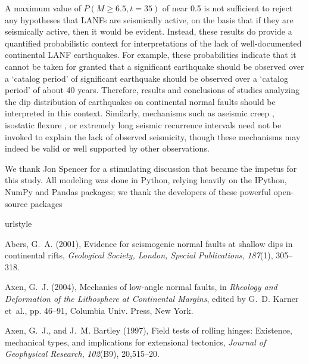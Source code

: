 \documentclass[draft,grl]{AGUTeX}
\begin{document}
\begin{article}
A maximum value of $P(M\ge6.5,t=35)$ of near 0.5 is not sufficient to
reject any hypotheses that LANFs are seismically active, on the basis that
if they are seismically active, then it would be evident.  Instead, these
results do provide a quantified probabilistic context for interpretations
of the lack of well-documented continental LANF earthquakes.  For example,
these probabilities indicate that it cannot be taken for granted that a
significant earthquake should be observed over a `catalog period' of
significant earthquake should be observed over a `catalog period' of
about 40 years. Therefore, results and conclusions of studies
analyzing the dip distribution of earthquakes on continental normal
faults \citep{jackson1987, collettinisibson2001} should be interpreted
in this context.  Similarly, mechanisms such as aseismic creep \citep
[e.g.,][]{collettini2011lanfmech, hreinsdottir2009altotib}, isostatic
flexure \citep[e.g.,][] {wernickeaxen1988rolling}, or extremely long
seismic recurrence intervals \citep{wernicke1995seis} need not be
invoked to explain the lack of observed seismicity, though these
mechanisms may indeed be valid or well supported by other
observations.


\begin{acknowledgements}
  We thank Jon Spencer for a stimulating discussion that became the
  impetus for this study.  All modeling was done in Python, relying heavily
  on the IPython, NumPy and Pandas packages; we thank the developers of these 
  powerful open-source packages
\end{acknowledgements}

\begin{thebibliography}{29}
\providecommand{\natexlab}[1]{#1}
\expandafter\ifx\csname urlstyle\endcsname\relax
  \providecommand{\doi}[1]{doi:\discretionary{}{}{}#1}\else
  \providecommand{\doi}{doi:\discretionary{}{}{}\begingroup
  \urlstyle{rm}\Url}\fi

Abers, G.~A. (2001), Evidence for seismogenic normal faults at shallow dips in
  continental rifts, \textit{Geological Society, London, Special Publications},
  \textit{187}(1), 305--318.

Axen, G.~J. (2004), Mechanics of low-angle normal faults, in \textit{Rheology
  and Deformation of the Lithosphere at Continental Margins}, edited by G.~D.
  Karner et~al., pp. 46--91, Columbia Univ. Press, New York.

Axen, G.~J., and J.~M. Bartley (1997), Field tests of rolling hinges:
  Existence, mechanical types, and implications for extensional tectonics,
  \textit{Journal of Geophysical Research}, \textit{102}(B9), 20,515--20.


\end{thebibliography}
\end{article}
\end{document}
